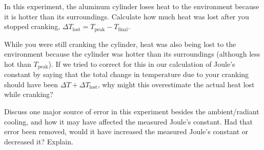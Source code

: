 \documentclass[addpoints]{physlabs}
\begin{document}
\begin{postlab}
\begin{parts}
\begin{solution}[1.5cm]
        \end{solution}
    \end{parts}

    \filbreak
    \question[1] In this experiment, the aluminum cylinder loses heat to the environment because it is hotter than its surroundings. Calculate how much heat was lost after you stopped cranking, $\Delta T_\text{lost}=T_\text{peak}-T_\text{final}$.
    \begin{solution}[1.5cm]
        
    \end{solution}

    \filbreak
    \question[2] While you were still cranking the cylinder, heat was also being lost to the environment because the cylinder was hotter than its surroundings (although less hot than $T_\text{peak}$). If we tried to correct for this in our calculation of Joule’s constant by saying that the total change in temperature due to your cranking should have been $\Delta T + \Delta T_\text{lost}$, why might this overestimate the actual heat lost while cranking?
    \begin{solution}[1.5cm]
        
    \end{solution}

    \filbreak
    \question[2] Discuss one major source of error in this experiment besides the ambient/radiant cooling, and how it may have affected the measured Joule’s constant. 
    Had that error been removed, would it have increased the measured Joule’s constant or decreased it? Explain.
    \begin{solution}[1.5cm]
        
    \end{solution}


\end{postlab}
\end{document}
